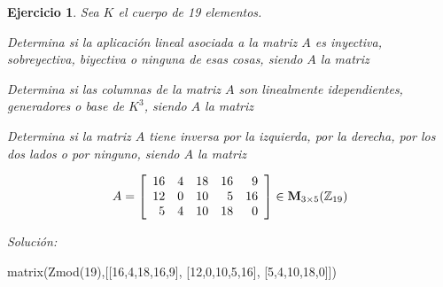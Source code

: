 \documentclass[12pt]{amsart}
\newtheorem{ejer}{Ejercicio}
\begin{document}
\begin{ejer} Sea $K$ el cuerpo de 19 elementos.
\newline
\noindent\begin{minipage}{\textwidth}
\begin{tcolorbox}[colback = green!20!white,title=Versión Aplicaciones]
Determina si la aplicaci\'on lineal asociada a la matriz $A$ es inyectiva, sobreyectiva, biyectiva o ninguna de esas cosas, siendo $A$ la matriz \end{tcolorbox}
\end{minipage} \newline
\noindent\begin{minipage}{\textwidth}
\begin{tcolorbox}[colback = blue!20!white,title=Versión Vectores]
Determina si las columnas de la matriz $A$ son linealmente idependientes, generadores o base de $K^{3}$, siendo $A$ la matriz \end{tcolorbox}
\end{minipage} \newline
\noindent\begin{minipage}{\textwidth} 
\begin{tcolorbox}[colback = red!20!white,title=Versión Inversas]
Determina si la matriz $A$ tiene inversa por la izquierda, por la derecha, por los dos lados o por ninguno, siendo $A$ la matriz 
\end{tcolorbox}
\end{minipage}
\[ A = \left[\begin{array}{rrrrr}
16 & 4 & 18 & 16 & 9 \\
12 & 0 & 10 & 5 & 16 \\
5 & 4 & 10 & 18 & 0
\end{array}\right] \in {\bf M}_{3\times 5}({\mathbb Z}_{19})\]
\end{ejer}

{\it Soluci\'on:}

\begin{sageblock}
matrix(Zmod(19),[[16,4,18,16,9],
[12,0,10,5,16],
[5,4,10,18,0]])
\end{sageblock}

\end{document}
